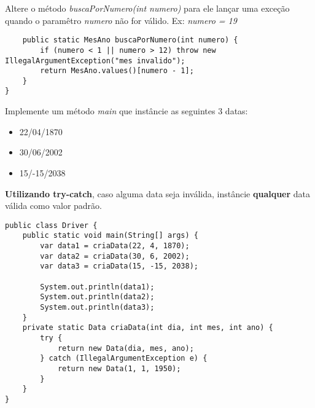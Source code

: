 \documentclass{lib/eng_softdoc}
\begin{document}
\vspace{0.5cm}
\subproblem Altere o método \textit{buscaPorNumero(int numero)} para ele lançar uma exceção quando o paramêtro \textit{numero} não 
for válido. Ex: \textit{numero = 19}
\begin{lstlisting}
	public static MesAno buscaPorNumero(int numero) {
		if (numero < 1 || numero > 12) throw new IllegalArgumentException("mes invalido");
		return MesAno.values()[numero - 1];
	}
}
\end{lstlisting}
\vspace{0.5cm}
\subproblem 
Implemente um método \textit{main} que instâncie as seguintes 3 datas:
\begin{itemize}
	\item 22/04/1870
	\item 30/06/2002
	\item 15/-15/2038 
\end{itemize}
\textbf{Utilizando try-catch}, caso alguma data seja inválida, instâncie \textbf{qualquer} data válida como valor padrão. 

\answer

\begin{lstlisting}
public class Driver {
	public static void main(String[] args) {
		var data1 = criaData(22, 4, 1870);
		var data2 = criaData(30, 6, 2002);
		var data3 = criaData(15, -15, 2038);

		System.out.println(data1);
		System.out.println(data2);
		System.out.println(data3);
	}
	private static Data criaData(int dia, int mes, int ano) {
		try {
			return new Data(dia, mes, ano);
		} catch (IllegalArgumentException e) {
			return new Data(1, 1, 1950);
		}
	}
}
\end{lstlisting}
\vspace{0.5cm}
\end{document}
